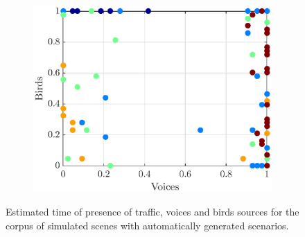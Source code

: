 \documentclass[11pt,a4paper]{article}
\begin{document}
\begin{figure}[h]
\begin{subfigure}[t]{0.33\textwidth}
        \includegraphics[width=\textwidth]{figures/vb_pres.eps}
    \end{subfigure}
    \caption{Estimated time of presence of traffic, voices and birds sources for the corpus of simulated scenes with automatically generated scenarios.}\label{fig:tvb_pres}
\end{figure}
\end{document}
